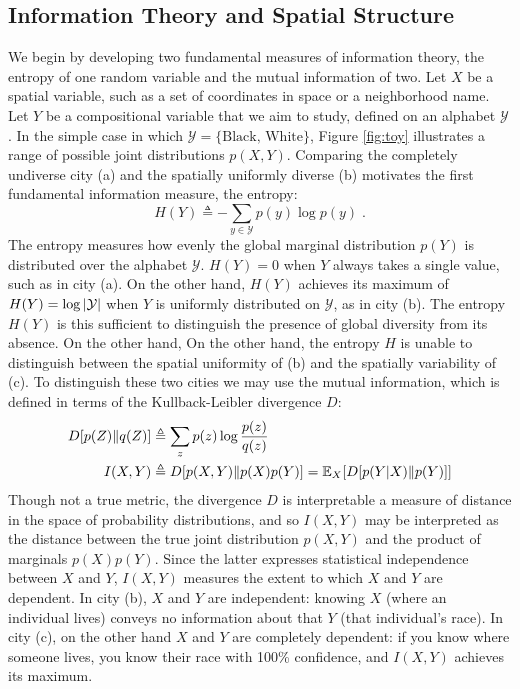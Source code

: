 	
\subsection{Information Theory and Spatial Structure}
	We begin by developing two fundamental measures of information theory, the entropy of one random variable and the mutual information of two. Let $X$ be a spatial variable, such as a set of coordinates in space or a neighborhood name. Let $Y$ be a compositional variable that we aim to study, defined on an alphabet $\mathcal{Y}$. In the simple case in which $\mathcal{Y}  = \{\text{Black, White}\}$, Figure \ref{fig:toy} illustrates a range of possible joint distributions $p(X,Y)$. Comparing the completely undiverse city (a) and the spatially uniformly diverse (b) motivates the first fundamental information measure, the entropy:
	\begin{equation}
		H(Y) \triangleq - \sum_{y \in \mathcal{Y}} p(y) \log p(y)\;.
	\end{equation}
	The entropy measures how evenly the global marginal distribution $p(Y)$ is distributed over the alphabet $\mathcal{Y}$. $H(Y) = 0$ when $Y$ always takes a single value, such as in city (a). On the other hand, $H(Y)$ achieves its maximum of $H(Y) = \log \left|\mathcal{Y}\right|$ when $Y$ is uniformly distributed on $\mathcal{Y}$, as in city (b). The entropy $H(Y)$ is this sufficient to distinguish the presence of global diversity from its absence. On the other hand, On the other hand, the entropy $H$ is unable to distinguish between the spatial uniformity of (b) and the spatially variability of (c). To distinguish these two cities we may use the mutual information, which is defined in terms of the Kullback-Leibler divergence $D$:
	\begin{align}
		D[p(Z)\|q(Z)] &\triangleq \sum_z p(z) \log \frac{p(z)}{q(z)} \\
		I(X,Y) &\triangleq D[p(X,Y) \| p(X)p(Y)] = \mathbb{E}_X[D[p(Y|X)\|p(Y)]]
	\end{align}
	Though not a true metric, the divergence $D$ is interpretable a measure of distance in the space of probability distributions, and so $I(X,Y)$ may be interpreted as the distance between the true joint distribution $p(X,Y)$ and the product of marginals $p(X)p(Y)$. Since the latter expresses statistical independence between $X$ and $Y$, $I(X,Y)$ measures the extent to which $X$ and $Y$ are dependent. In city (b), $X$ and $Y$ are independent: knowing $X$ (where an individual lives) conveys no information about that $Y$ (that individual's race).  In city (c), on the other hand $X$ and $Y$ are completely dependent: if you know where someone lives, you know their race with 100\% confidence, and $I(X,Y)$ achieves its maximum. 

